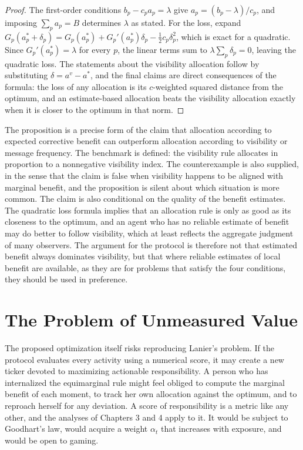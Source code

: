 \documentclass[11pt]{report}
\theoremstyle{definition}
\theoremstyle{remark}
\begin{document}
\begin{proof}
The first-order conditions $b_p-c_pa_p=\lambda$ give $a_p=(b_p-\lambda)/c_p$, and imposing $\sum_pa_p=B$ determines $\lambda$ as stated. For the loss, expand $G_p(a^\ast_p+\delta_p)=G_p(a^\ast_p)+G_p'(a_p^\ast)\delta_p-\tfrac12c_p\delta_p^2$, which is exact for a quadratic. Since $G_p'(a_p^\ast)=\lambda$ for every $p$, the linear terms sum to $\lambda\sum_p\delta_p=0$, leaving the quadratic loss. The statements about the visibility allocation follow by substituting $\delta=a^v-a^\ast$, and the final claims are direct consequences of the formula: the loss of any allocation is its $c$-weighted squared distance from the optimum, and an estimate-based allocation beats the visibility allocation exactly when it is closer to the optimum in that norm.
\end{proof}

The proposition is a precise form of the claim that allocation according to expected corrective benefit can outperform allocation according to visibility or message frequency. The benchmark is defined: the visibility rule allocates in proportion to a nonnegative visibility index. The counterexample is also supplied, in the sense that the claim is false when visibility happens to be aligned with marginal benefit, and the proposition is silent about which situation is more common. The claim is also conditional on the quality of the benefit estimates. The quadratic loss formula implies that an allocation rule is only as good as its closeness to the optimum, and an agent who has no reliable estimate of benefit may do better to follow visibility, which at least reflects the aggregate judgment of many observers. The argument for the protocol is therefore not that estimated benefit always dominates visibility, but that where reliable estimates of local benefit are available, as they are for problems that satisfy the four conditions, they should be used in preference.

\section{The Problem of Unmeasured Value}

The proposed optimization itself risks reproducing Lanier's problem. If the protocol evaluates every activity using a numerical score, it may create a new ticker devoted to maximizing actionable responsibility. A person who has internalized the equimarginal rule might feel obliged to compute the marginal benefit of each moment, to track her own allocation against the optimum, and to reproach herself for any deviation. A score of responsibility is a metric like any other, and the analyses of Chapters 3 and 4 apply to it. It would be subject to Goodhart's law, would acquire a weight $\alpha_t$ that increases with exposure, and would be open to gaming.
\end{document}
